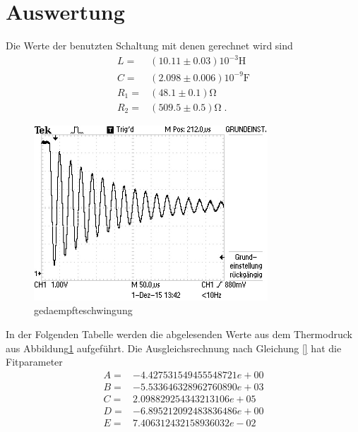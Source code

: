 \section{Auswertung}
\label{sec:Auswertung}
Die Werte der benutzten Schaltung mit denen gerechnet wird sind
\begin{align*}
  L=&(10.11\pm0.03)10^{-3}\si{\henry}\\
  C=&(2.098\pm0.006)10^{-9}\si{\farad}\\
  R_1=&(48.1\pm0.1)\si{\ohm}\\
  R_2=&(509.5\pm0.5)\si{\ohm}\;.
\end{align*}
\begin{figure}
  \centering
  \includegraphics[width=0.78\textwidth]{Thermodruck.JPG}
  \caption{gedaempfteschwingung}
  \label{fig:termodruck}
\end{figure}
In der Folgenden Tabelle werden die abgelesenden Werte aus dem Thermodruck
aus Abbildung\ref{fig:termodruck} aufgeführt. Die Ausgleichsrechnung nach Gleichung
\eqref{} hat die Fitparameter
\begin{align*}
  A=&-4.427531549455548721e+00  \\
  B=&-5.533646328962760890e+03  \\
  C=&2.098829254343213106e+05   \\
  D=&-6.895212092483836486e+00  \\
  E=&7.406312432158936032e-02
\end{align*}
